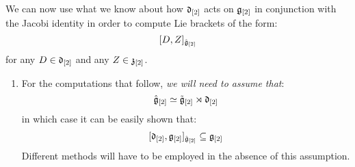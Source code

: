         \begin{remark} \label{remark: derivation_action_on_toroidal_centres}
            We can now use what we know about how $\mathfrak{d}_{[2]}$ acts on $\mathfrak{g}_{[2]}$ in conjunction with the Jacobi identity in order to compute Lie brackets of the form:
                $$[D, Z]_{\hat{\mathfrak{g}}_{[2]}}$$
            for any $D \in \mathfrak{d}_{[2]}$ and any $Z \in \mathfrak{z}_{[2]}$. 
        
            \begin{enumerate}
                \item For the computations that follow, \textit{we will need to assume that}:
                    $$\hat{\mathfrak{g}}_{[2]} \simeq \tilde{\mathfrak{g}}_{[2]}\rtimes \mathfrak{d}_{[2]}$$
                in which case it can be easily shown that:
                    $$[\mathfrak{d}_{[2]}, \mathfrak{g}_{[2]}]_{\hat{\mathfrak{g}}_{[2]}} \subseteq \mathfrak{g}_{[2]}$$
                Different methods will have to be employed in the absence of this assumption.
    

\end{enumerate}
\end{remark}
